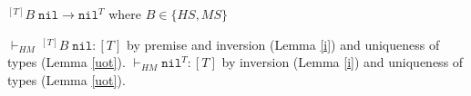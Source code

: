 \begin{case}
$^{[T]}B\;\mathtt{nil}\rightarrow\mathtt{nil}^{T}$ where $B\in\lbrace HS,MS\rbrace$

$\vdash_{HM}\,^{[T]}B\;\mathtt{nil}:[T]$ by premise and inversion (Lemma \ref{i}) and uniqueness of types (Lemma \ref{uot}).  $\vdash_{HM}\mathtt{nil}^{T}:[T]$ by inversion (Lemma \ref{i}) and uniqueness of types (Lemma \ref{uot}).
\end{case}